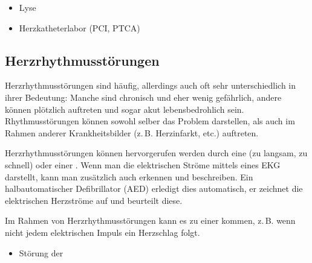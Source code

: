 {{}
{
\begin{itemize}
  \item Lyse
  \item Herzkatheterlabor (PCI, PTCA)%
\end{itemize}

}{}{}{}


\bigskip



\clearpage
\subsection{Herzrhythmusstörungen}
\label{topic:herzrhythmusstoerungen}

Herzrhythmusstörungen sind häufig, allerdings auch oft sehr
unterschiedlich in ihrer Bedeutung: Manche sind chronisch
und eher wenig gefährlich, andere können plötzlich auftreten
und sogar akut lebensbedrohlich sein. Rhythmusstörungen
können sowohl selber das Problem darstellen, als auch  im Rahmen anderer Krankheitsbilder (z.\,B.
Herzinfarkt, etc.) auftreten.

{%
Herzrhythmusstörungen können hervorgerufen werden durch eine
 (zu langsam, zu schnell) oder
einer . Wenn man die
elektrischen Ströme mittels eines EKG darstellt, kann man
zusätzlich auch  erkennen und beschreiben. Ein halbautomatischer
Defibrillator (AED) erledigt dies automatisch, er zeichnet
die elektrischen Herzströme auf und beurteilt diese.

Im Rahmen von Herzrhythmusstörungen kann es zu einer
 kommen, z.\,B. wenn nicht jedem elektrischen
Impuls ein Herzschlag folgt.
}{
\begin{itemize}
  \item Störung der
\end{itemize}

}}
